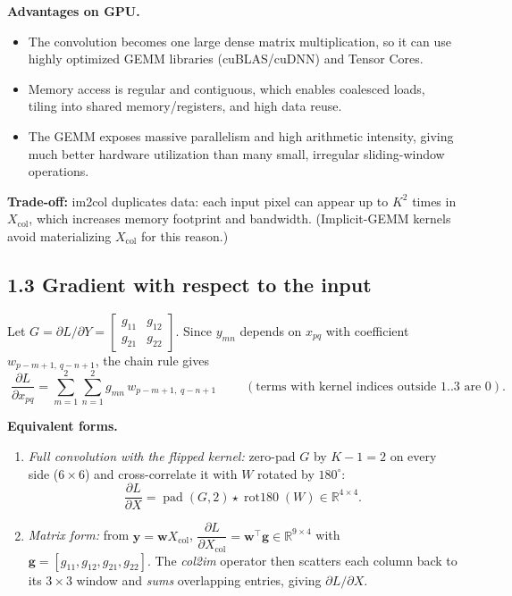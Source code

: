 \documentclass[11pt]{article}
\begin{document}
\textbf{Advantages on GPU.}
\begin{itemize}[leftmargin=1.5em]
\item The convolution becomes one large dense matrix multiplication, so it can use highly optimized GEMM libraries (cuBLAS/cuDNN) and Tensor Cores.
\item Memory access is regular and contiguous, which enables coalesced loads, tiling into shared memory/registers, and high data reuse.
\item The GEMM exposes massive parallelism and high arithmetic intensity, giving much better hardware utilization than many small, irregular sliding-window operations.
\end{itemize}
\textbf{Trade-off:} im2col duplicates data: each input pixel can appear up to $K^2$ times in $X_{\text{col}}$, which increases memory footprint and bandwidth. (Implicit-GEMM kernels avoid materializing $X_{\text{col}}$ for this reason.)

\subsection*{1.3 Gradient with respect to the input}

Let $G=\partial L/\partial Y=\begin{bmatrix}g_{11}&g_{12}\\g_{21}&g_{22}\end{bmatrix}$. Since $y_{mn}$ depends on $x_{pq}$ with coefficient $w_{p-m+1,\,q-n+1}$, the chain rule gives
\[
\boxed{\;\frac{\partial L}{\partial x_{pq}}=\sum_{m=1}^{2}\sum_{n=1}^{2} g_{mn}\,w_{p-m+1,\;q-n+1}\;}
\qquad(\text{terms with kernel indices outside }1..3\text{ are }0).
\]

\textbf{Equivalent forms.}
\begin{enumerate}[leftmargin=1.5em]
\item \emph{Full convolution with the flipped kernel:} zero-pad $G$ by $K-1=2$ on every side ($6\times6$) and cross-correlate it with $W$ rotated by $180^\circ$:
\[
\frac{\partial L}{\partial X}=\operatorname{pad}(G,2)\star\operatorname{rot180}(W)\in\mathbb{R}^{4\times4}.
\]
\item \emph{Matrix form:} from $\mathbf{y}=\mathbf{w}X_{\text{col}}$,
$\dfrac{\partial L}{\partial X_{\text{col}}}=\mathbf{w}^{\top}\mathbf{g}\in\mathbb{R}^{9\times4}$ with $\mathbf{g}=[g_{11},g_{12},g_{21},g_{22}]$. The \emph{col2im} operator then scatters each column back to its $3\times3$ window and \emph{sums} overlapping entries, giving $\partial L/\partial X$.
\end{enumerate}
\end{document}
